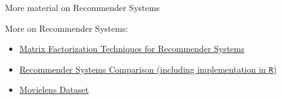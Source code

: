 \documentclass[11pt,compress,t,notes=noshow, xcolor=table]{beamer}
\begin{document}
\begin{vbframe}{More material on Recommender Systems}

More on Recommender Systems:
\begin{itemize}
\item \href{https://endymecy.gitbooks.io/spark-ml-source-analysis/content/\%E6\%8E\%A8\%E8\%8D\%90/papers/Matrix\%20Factorization\%20Techniques\%20for\%20Recommender\%20Systems.pdf}{Matrix Factorization Techniques for Recommender Systems}
\item \href{https://rpubs.com/tarashnot/recommender_comparison}{Recommender Systems Comparison (including implementation in \texttt{R})}
\item \href{https://grouplens.org/datasets/movielens/100k/}{Movielens Dataset}
\end{itemize}

\end{vbframe}


\endlecture
\end{document}
